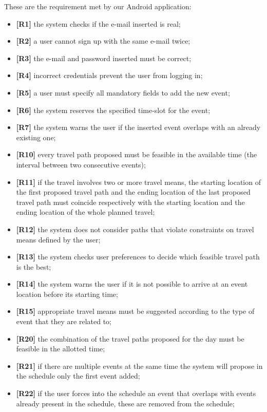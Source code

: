 These are the requirement met by our Android application:
\begin{itemize}
	\item \textbf{[R1]} the system checks if the e-mail inserted is real;
	\item \textbf{[R2]} a user cannot sign up with the same e-mail twice;
	\item \textbf{[R3]} the e-mail and password inserted must be correct;
	\item \textbf{[R4]} incorrect credentials prevent the user from logging in; 
	\item \textbf{[R5]} a user must specify all mandatory fields to add the new event;
	\item \textbf{[R6]} the system reserves the specified time-slot for the event;
	\item \textbf{[R7]} the system warns the user if the inserted event overlaps with an already existing one;
	\item \textbf{[R10]} every travel path proposed must be feasible in the available time (the interval between two consecutive events);
	\item \textbf{[R11]} if the travel involves two or more travel means, the starting location of the first proposed travel path and the ending location of the last proposed travel path must coincide respectively with the starting location and the ending location of the whole planned travel;
	\item \textbf{[R12]} the system does not consider paths that violate constraints on travel means defined by the user;
	\item \textbf{[R13]} the system checks user preferences to decide which feasible travel path is the best;
	\item \textbf{[R14]} the system warns the user if it is not possible to arrive at an event location before its starting time;
	\item \textbf{[R15]} appropriate travel means must be suggested according to the type of event that they are related to; 
	\item \textbf{[R20]} the combination of the travel paths proposed for the day must be feasible in the allotted time;
	\item \textbf{[R21]} if there are multiple events at the same time the system will propose in the schedule only the first event added;
	\item \textbf{[R22]} if the user forces into the schedule an event that overlaps with events already present in the schedule, these are removed from the schedule;

\end{itemize}
